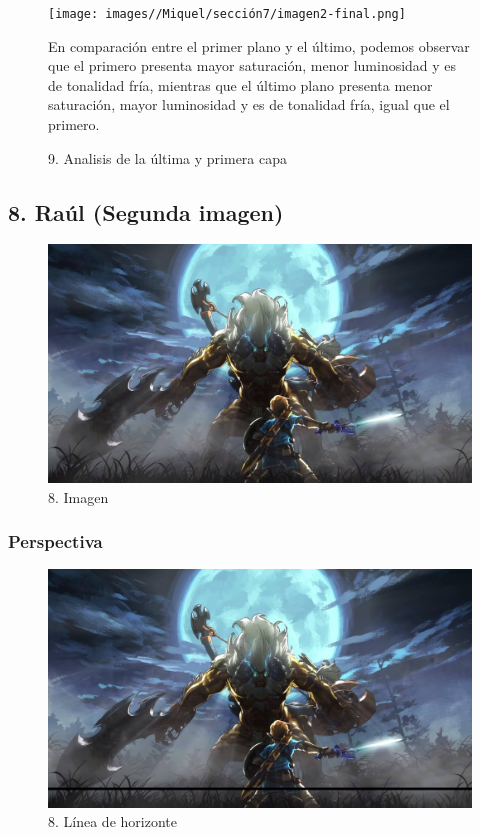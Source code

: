 \documentclass[12pt]{article}
\begin{document}
    \begin{figure}[H]
      \centering
      \texttt{[image: images//Miquel/sección7/imagen2-final.png]}
      \caption{\small 9. Analisis de la última y primera capa}

    En comparación entre el primer plano y el último, podemos observar que el primero presenta mayor saturación, menor luminosidad y es de tonalidad fría, mientras que el último plano presenta menor saturación, mayor luminosidad y es de tonalidad fría, igual que el primero.


    \end{figure}

    \subsection{8. Raúl (Segunda imagen)}
    \begin{figure}[H]
      \centering
      \includegraphics[scale=0.25]{images/Concepts/8_concept_art}
      \caption{\small 8. Imagen}
    \end{figure}

        \subsubsection{Perspectiva}

\begin{figure}[H]
      \centering
      \includegraphics[scale=0.25]{images/Raúl/Sección 8/Imagen 8 horizonte.jpg}
      \caption{\small 8. Línea de horizonte}
    \end{figure}
\end{document}
